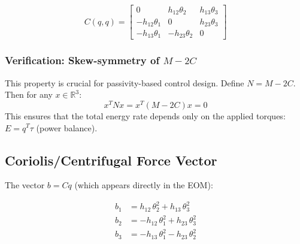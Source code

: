 \documentclass[11pt,a4paper]{article}
\newcommand{\vc}[1]{\bm{#1}}
\newcommand{\mat}[1]{\bm{#1}}
\newcommand{\dt}[1]{\dot{#1}}
\def\vc#1{#1}%
\def\mat#1{#1}%
\def\dt#1{#1}%
\def\bm#1{#1}%
\begin{document}
\begin{resultbox}
\begin{equation}
\vc{C}(\vc{q}, \dt{\vc{q}}) =
\begin{bmatrix}
    0            & h_{12} \dt{\theta}_2  & h_{13} \dt{\theta}_3 \\
    -h_{12} \dt{\theta}_1 & 0             & h_{23} \dt{\theta}_3 \\
    -h_{13} \dt{\theta}_1 & -h_{23} \dt{\theta}_2 & 0
\end{bmatrix}
\label{eq:coriolis_matrix}
\end{equation}
\end{resultbox}

\subsubsection*{Verification: Skew-symmetry of $\dt{\mat{M}} - 2\vc{C}$}

This property is crucial for passivity-based control design. Define
$\mat{N} = \dt{\mat{M}} - 2\vc{C}$. Then for any $\vc{x} \in \mathbb{R}^3$:
\begin{equation}
    \vc{x}^T \mat{N} \vc{x} = \vc{x}^T (\dt{\mat{M}} - 2\vc{C}) \vc{x} = 0
    \label{eq:skew_sym}
\end{equation}
This ensures that the total energy rate depends only on the applied torques:
$\dt{E} = \dt{\vc{q}}^T \vc{\tau}$ (power balance).

\subsection{Coriolis/Centrifugal Force Vector}

The vector $\vc{b} = \vc{C}\dt{\vc{q}}$ (which appears directly in the EOM):

\begin{resultbox}[Coriolis/Centrifugal Vector $\vc{b} = \vc{C}\dt{\vc{q}}$]
\begin{align}
    b_1 &= h_{12} \, \dt{\theta}_2^2 + h_{13} \, \dt{\theta}_3^2 \label{eq:b1} \\[4pt]
    b_2 &= -h_{12} \, \dt{\theta}_1^2 + h_{23} \, \dt{\theta}_3^2 \label{eq:b2} \\[4pt]
    b_3 &= -h_{13} \, \dt{\theta}_1^2 - h_{23} \, \dt{\theta}_2^2 \label{eq:b3}
\end{align}
\end{resultbox}
\end{document}
